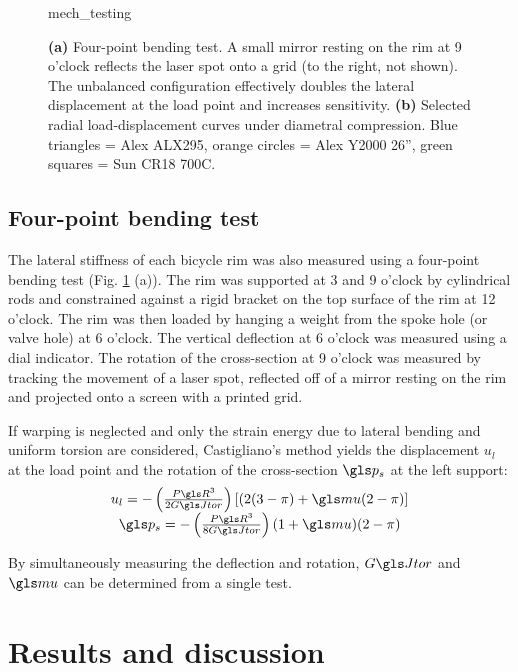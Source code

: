 \documentclass[../thesis.tex]{subfiles}
\begin{document}
\begin{figure}
\centering
{mech_testing}
\caption[Mechanical testing of rims]{\textbf{(a)} Four-point bending test. A small mirror resting on the rim at 9 o’clock reflects the laser spot onto a grid (to the right, not shown). The unbalanced configuration effectively doubles the lateral displacement at the load point and increases sensitivity. \textbf{(b)} Selected radial load-displacement curves under diametral compression. Blue triangles = Alex ALX295, orange circles = Alex Y2000 26'', green squares = Sun CR18 700C.}
\label{fig:mech_tests}
\end{figure}

\subsection{Four-point bending test}

The lateral stiffness of each bicycle rim was also measured using a four-point bending test \cite{Wilson2004} (Fig. \ref{fig:mech_tests} (a)). The rim was supported at 3 and 9 o'clock by cylindrical rods and constrained against a rigid bracket on the top surface of the rim at 12 o'clock. The rim was then loaded by hanging a weight from the spoke hole (or valve hole) at 6 o'clock. The vertical deflection at 6 o'clock was measured using a dial indicator. The rotation of the cross-section at 9 o'clock was measured by tracking the movement of a laser spot, reflected off of a mirror resting on the rim and projected onto a screen with a printed grid.

If warping is neglected and only the strain energy due to lateral bending and uniform torsion are considered, Castigliano's method yields the displacement $u_l$ at the load point and the rotation of the cross-section $\p_s$ at the left support:
\begin{equation}\label{eq:u_4p}
\begin{array}{c}
u_l = -\left(\frac{P\R^3}{2\GJ}\right) [(2(3-\pi)+\m(2-\pi)]\\
\p_s = -\left(\frac{P\R^3}{8\GJ}\right) (1+\m)(2-\pi)
\end{array}
\end{equation}

By simultaneously measuring the deflection and rotation, $\GJ$ and $\m$ can be determined from a single test.

\section{Results and discussion}
\end{document}
